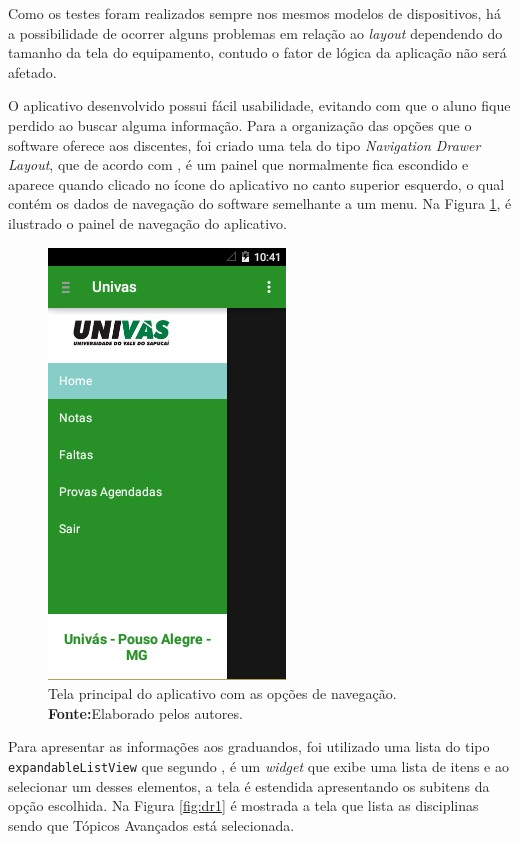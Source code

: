 	\par Como os testes foram realizados sempre nos mesmos modelos de dispositivos,
há a possibilidade de ocorrer alguns problemas em relação ao \textit{layout}
dependendo do tamanho da tela do equipamento, contudo o fator de lógica da
aplicação não será afetado.

	\par O aplicativo desenvolvido possui fácil usabilidade, evitando com que o
aluno fique perdido ao buscar alguma informação. Para a organização das opções
que o software oferece aos discentes, foi criado uma tela do tipo
\textit{Navigation Drawer Layout}, que de acordo com ,
é um painel que normalmente fica escondido e aparece quando clicado no ícone do
aplicativo no canto superior esquerdo, o qual contém os dados de navegação do
software semelhante a um menu. Na Figura \ref{fig:dr}, é ilustrado o painel de
navegação do aplicativo.
	 
\begin{figure}[h!]
	\centerline{\includegraphics[scale=0.8]{./imagens/3_discussao_resultados/dr.jpg}}
	\caption[Tela principal do aplicativo com as opções de navegação]{Tela
	principal do aplicativo com as opções de navegação.
	\textbf{Fonte:}Elaborado pelos autores.}
	\label{fig:dr}
\end{figure}

	\par Para apresentar as informações aos graduandos, foi utilizado uma lista do
tipo \texttt{expandableListView} que segundo , é um
\textit{widget} que exibe uma lista de itens e ao selecionar um desses
elementos, a tela é estendida apresentando os subitens da opção escolhida. Na
Figura \ref{fig:dr1} é mostrada a tela que lista as disciplinas sendo que
Tópicos Avançados está selecionada.


